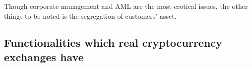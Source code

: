 %
Though corporate management and AML are the most crotical issues,
 the other things to be noted is the segregation of customers' asset.

\subsection{Functionalities which real cryptocurrency exchanges have}

